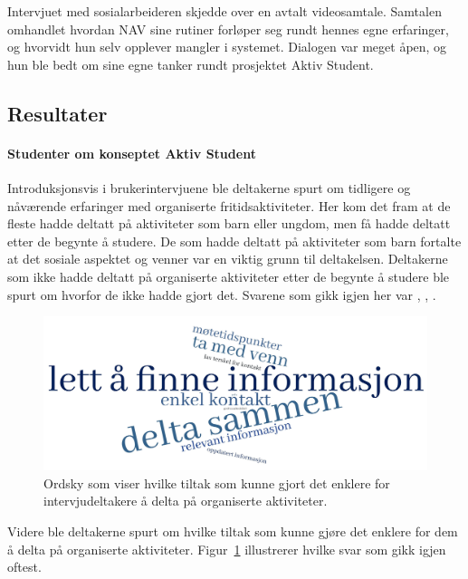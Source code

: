 \vspace{5mm} %

Intervjuet med sosialarbeideren skjedde over en avtalt videosamtale. Samtalen omhandlet hvordan NAV sine rutiner forløper seg rundt hennes egne erfaringer, og hvorvidt hun selv opplever mangler i systemet. Dialogen var meget åpen, og hun ble bedt om sine egne tanker rundt prosjektet Aktiv Student.


\subsection{Resultater}

\paragraph{Studenter om konseptet Aktiv Student}
Introduksjonsvis i brukerintervjuene ble deltakerne spurt om tidligere og nåværende erfaringer med organiserte fritidsaktiviteter. Her kom det fram at de fleste hadde deltatt på aktiviteter som barn eller ungdom, men få hadde deltatt etter de begynte å studere. De som hadde deltatt på aktiviteter som barn fortalte at det sosiale aspektet og venner var en viktig grunn til deltakelsen. Deltakerne som ikke hadde deltatt på organiserte aktiviteter etter de begynte å studere ble spurt om hvorfor de ikke hadde gjort det. Svarene som gikk igjen her var , , .

\begin{figure}[H]
\includegraphics[width=\textwidth]{Illustrasjoner/ordsky-tiltak.jpg}
\caption{Ordsky som viser hvilke tiltak som kunne gjort det enklere for intervjudeltakere å delta på organiserte aktiviteter.}
\label{fig:ordsky-tiltak}
\end{figure}

Videre ble deltakerne spurt om hvilke tiltak som kunne gjøre det enklere for dem å delta på organiserte aktiviteter. Figur~\ref{fig:ordsky-tiltak} illustrerer hvilke svar som gikk igjen oftest.

